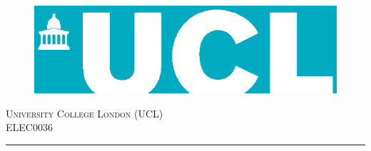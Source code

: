 


\begin{titlepage} %


\begin{figure}[!htb]
\centering
\includegraphics[width=\linewidth]{Banner1.eps}
\end{figure}



	\newcommand{\HRule}{\rule{\linewidth}{0.5mm}} %
	
	\center %
	
	
	\textsc{\LARGE University College London (UCL)}\\[1.5cm] %
	
	\textsc{\Large ELEC0036}\\[0.5cm] %
	
	
	
	\HRule\\[0.4cm]
	

\end{titlepage}
